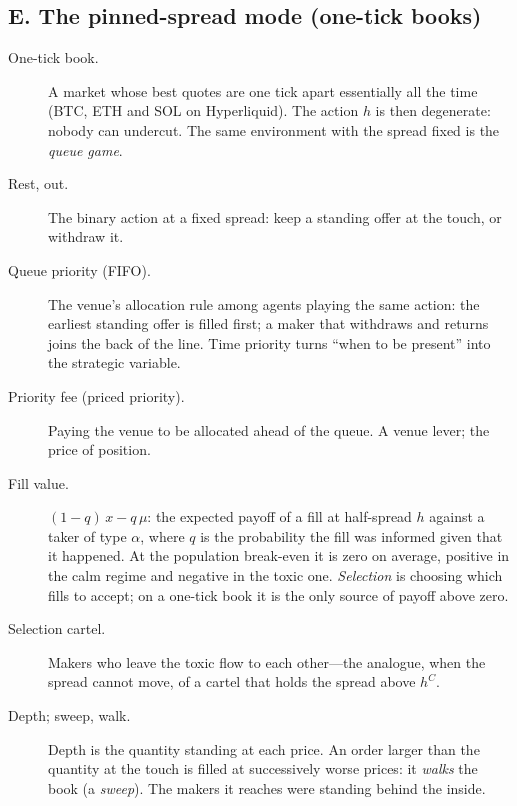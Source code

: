 \subsection*{E. The pinned-spread mode (one-tick books)}
\begin{description}
\item[One-tick book.] A market whose best quotes are one tick apart essentially all the time (BTC, ETH and SOL on Hyperliquid). The action $h$ is then degenerate: nobody can undercut. The same environment with the spread fixed is the \emph{queue game}.
\item[Rest, out.] The binary action at a fixed spread: keep a standing offer at the touch, or withdraw it.
\item[Queue priority (FIFO).] The venue's allocation rule among agents playing the same action: the earliest standing offer is filled first; a maker that withdraws and returns joins the back of the line. Time priority turns ``when to be present'' into the strategic variable.
\item[Priority fee (priced priority).] Paying the venue to be allocated ahead of the queue. A venue lever; the price of position.
\item[Fill value.] $(1-q)\,x-q\,\mu$: the expected payoff of a fill at half-spread $h$ against a taker of type $\alpha$, where $q$ is the probability the fill was informed given that it happened. At the population break-even it is zero on average, positive in the calm regime and negative in the toxic one. \emph{Selection} is choosing which fills to accept; on a one-tick book it is the only source of payoff above zero.
\item[Selection cartel.] Makers who leave the toxic flow to each other---the analogue, when the spread cannot move, of a cartel that holds the spread above $h^C$.
\item[Depth; sweep, walk.] Depth is the quantity standing at each price. An order larger than the quantity at the touch is filled at successively worse prices: it \emph{walks} the book (a \emph{sweep}). The makers it reaches were standing behind the inside.
\end{description}

